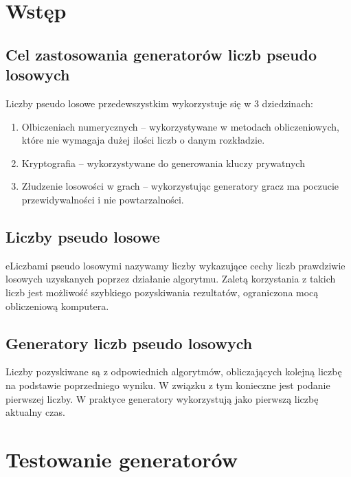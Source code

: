 \documentclass[11pt]{aghdpl}
\author{Żaneta Błaszczuk, Rafał Kozik, Filip Kubicz, Jakub Nowak, Jakub Porębski}
\date{2014}
\begin{document}
\titlepages
\section{Wstęp}
\subsection{Cel zastosowania generatorów liczb pseudo losowych}
Liczby pseudo losowe przedewszystkim wykorzystuje się w 3 dziedzinach:
\begin{enumerate}
\item Olbiczeniach numerycznych – wykorzystywane w metodach obliczeniowych, które nie wymagaja dużej ilości liczb o danym rozkładzie.
\item Kryptografia – wykorzystywane do generowania kluczy prywatnych
\item Złudzenie losowości w grach – wykorzystując generatory gracz ma poczucie przewidywalności i nie powtarzalności.  
\end{enumerate}
\subsection{Liczby pseudo losowe}
eLiczbami pseudo losowymi nazywamy liczby wykazujące cechy liczb prawdziwie losowych uzyskanych poprzez działanie algorytmu. Zaletą korzystania z takich liczb jest możliwość szybkiego pozyskiwania rezultatów, ograniczona mocą obliczeniową komputera.
\subsection{Generatory liczb pseudo losowych}
Liczby pozyskiwane są z odpowiednich algorytmów, obliczających kolejną liczbę na podstawie poprzedniego wyniku. W związku z tym konieczne jest podanie pierwszej liczby. W praktyce generatory wykorzystują jako pierwszą liczbę aktualny czas. 
\section{Testowanie generatorów}
\end{document}
